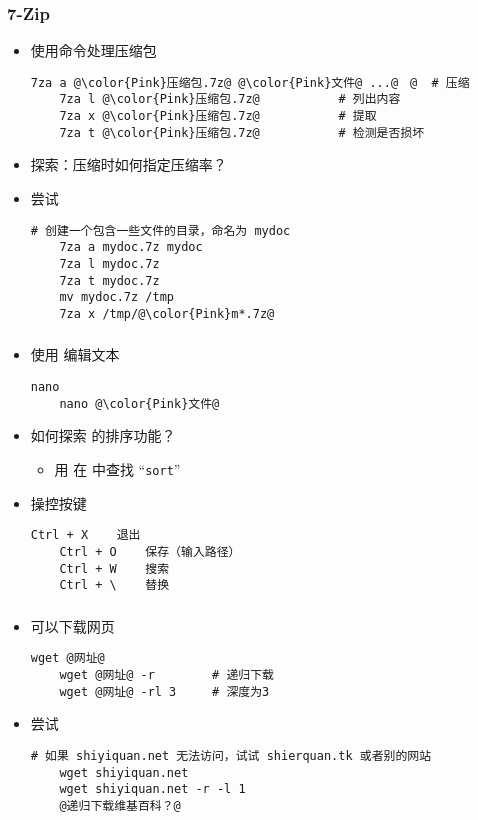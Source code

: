 \begin{frame} [fragile]
	\frametitle{7-Zip}
	\begin{itemize}
	\item 使用命令处理压缩包
	\begin{lstlisting}[style=bashstyle, gobble=4, texcl, escapechar=@]
	7za a @\color{Pink}压缩包.7z@ @\color{Pink}文件@ ...@　@	# 压缩
	7za l @\color{Pink}压缩包.7z@			 # 列出内容
	7za x @\color{Pink}压缩包.7z@			 # 提取
	7za t @\color{Pink}压缩包.7z@			 # 检测是否损坏
	\end{lstlisting}
	\item 探索：压缩时如何指定压缩率？
	\item 尝试
	\begin{lstlisting}[style=bashstyle, gobble=4, texcl, escapechar=@]
	# 创建一个包含一些文件的目录，命名为 mydoc
	7za a mydoc.7z mydoc
	7za l mydoc.7z
	7za t mydoc.7z
	mv mydoc.7z /tmp
	7za x /tmp/@\color{Pink}m*.7z@
	\end{lstlisting}
	\end{itemize}
\end{frame}

\begin{frame} [fragile]
	\frametitle{}
	\linespread{1.25}
	\begin{itemize}
	\item 使用  编辑文本
	\begin{lstlisting}[style=bashstyle, gobble=4, texcl, escapechar=@]
	nano
	nano @\color{Pink}文件@
	\end{lstlisting}
	\item 如何探索  的排序功能？
		\begin{itemize}
		\item 用  在  中查找 ``\texttt{sort}''
		\end{itemize}
	\item 操控按键
	\begin{lstlisting}[basicstyle=\ttfamily]
	Ctrl + X	退出
	Ctrl + O	保存（输入路径）
	Ctrl + W	搜索
	Ctrl + \	替换
	\end{lstlisting}
	\end{itemize}
\end{frame}

\begin{frame} [fragile]
	\frametitle{}
	\linespread{1.25}
	\begin{itemize}
	\item {}可以下载网页
	\begin{lstlisting}[style=bashstyle, gobble=4, texcl, escapechar=@]
	wget @网址@
	wget @网址@ -r		# 递归下载
	wget @网址@ -rl 3		# 深度为3
	\end{lstlisting}
	\item 尝试
	\begin{lstlisting}[style=bashstyle, gobble=4, texcl, escapechar=@]
	# 如果 shiyiquan.net 无法访问，试试 shierquan.tk 或者别的网站
	wget shiyiquan.net
	wget shiyiquan.net -r -l 1
	@递归下载维基百科？@
	\end{lstlisting}
	\end{itemize}
\end{frame}

